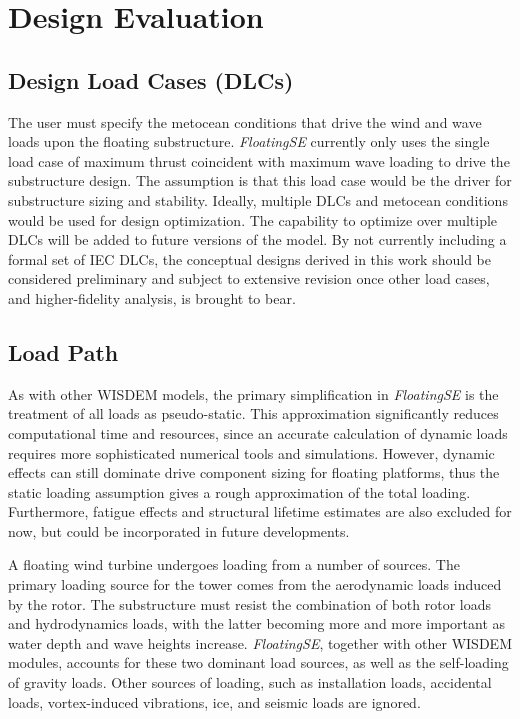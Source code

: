 \chapter{Design Evaluation}
\label{sec:theory}

\section{Design Load Cases (DLCs)}
The user must specify the metocean conditions that drive the wind and
wave loads upon the floating substructure.  \textit{FloatingSE}
currently only uses the single load case of maximum thrust coincident
with maximum wave loading to drive the substructure design. The
assumption is that this load case would be the driver for substructure
sizing and stability.  Ideally, multiple DLCs and metocean conditions
would be used for design optimization.  The capability to optimize over
multiple DLCs will be added to future versions of the model.  By not
currently including a formal set of IEC DLCs, the conceptual designs
derived in this work should be considered preliminary and subject to
extensive revision once other load cases, and higher-fidelity analysis,
is brought to bear.

\section{Load Path}
As with other WISDEM models, the primary simplification in
\textit{FloatingSE} is the treatment of all loads as pseudo-static. This
approximation significantly reduces computational time and resources,
since an accurate calculation of dynamic loads requires more
sophisticated numerical tools and simulations.  However, dynamic effects
can still dominate drive component sizing for floating platforms, thus
the static loading assumption gives a rough approximation of the total
loading.  Furthermore, fatigue effects and structural lifetime estimates
are also excluded for now, but could be incorporated in future
developments.

A floating wind turbine undergoes loading from a number of sources.  The
primary loading source for the tower comes from the aerodynamic loads
induced by the rotor. The substructure must resist the combination of
both rotor loads and hydrodynamics loads, with the latter becoming more
and more important as water depth and wave heights increase.
\textit{FloatingSE}, together with other WISDEM modules, accounts for
these two dominant load sources, as well as the self-loading of gravity
loads.  Other sources of loading, such as installation loads, accidental
loads, vortex-induced vibrations, ice, and seismic loads are ignored.

